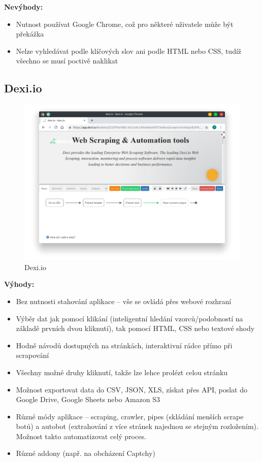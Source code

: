 \documentclass[thesis=B,czech]{FITthesis}[2012/06/26]
\begin{document}
\textbf{Nevýhody:}
\begin{itemize}
	\item Nutnost používat Google Chrome, což pro některé uživatele může být překážka
	\item Nelze vyhledávat podle klíčových slov ani podle HTML nebo CSS, tudíž všechno se musí poctivě naklikat
\end{itemize}


\newpage
\subsection{Dexi.io}
\begin{figure}[h!]
	\includegraphics[width=\linewidth]{images/Dexiio.png}
	\caption{Dexi.io}
	\label{fig:dexi.io}
\end{figure}

\textbf{Výhody:}
\begin{itemize}
	\item Bez nutnosti stahování aplikace -- vše se ovládá přes webové rozhraní
	\item Výběr dat jak pomocí klikání (inteligentní hledání vzorců/podobností na základě prvních dvou kliknutí), tak pomocí HTML, CSS nebo textové shody
	\item Hodně návodů dostupných na stránkách, interaktivní rádce přímo při scrapování
	\item Všechny možné druhy kliknutí, takže lze lehce prolézt celou stránku
	\item Možnost exportovat data do CSV, JSON, XLS, získat přes API, poslat do Google Drive, Google Sheets nebo Amazon S3
	\item Různé módy aplikace -- scraping, crawler, pipes (skládání menších scrape botů) a autobot (extrahování z více stránek najednou se stejným rozložením). Možnost takto automatizovat celý proces.
	\item Různé addony (např. na obcházení Captchy)
\end{itemize}
\end{document}
